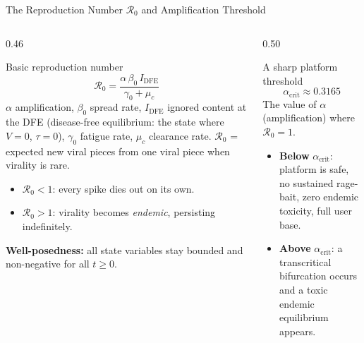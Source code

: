 \documentclass[aspectratio=169,11pt]{beamer}
\begin{document}
\begin{frame}{The Reproduction Number $\mathcal{R}_0$ and Amplification Threshold}
  \begin{columns}[T]
    \begin{column}{0.46\textwidth}
      \begin{block}{Basic reproduction number}
        \[
          \mathcal{R}_0
          = \frac{\alpha\,\beta_0\,I_{\mathrm{DFE}}}{\gamma_0 + \mu_c}
        \]
        \scriptsize
        $\alpha$ amplification, $\beta_0$ spread rate,
        $I_{\mathrm{DFE}}$ ignored content at the DFE
        (disease-free equilibrium: the state where $V{=}0$, $\tau{=}0$),
        $\gamma_0$ fatigue rate, $\mu_c$ clearance rate.
        \vspace{0.1em}
        \small $\mathcal{R}_0$ = expected new viral pieces from one viral piece
        when virality is rare.
      \end{block}

      \vspace{0.2em}
      \small
      \begin{itemize}
        \item $\mathcal{R}_0 < 1$: every spike dies out on its own.
        \item $\mathcal{R}_0 > 1$: virality becomes \emph{endemic},
              persisting indefinitely.
      \end{itemize}

      \vspace{0.15em}
      \small\textbf{Well-posedness:} all state variables stay bounded
      and non-negative for all $t \geq 0$.
    \end{column}
    \begin{column}{0.50\textwidth}
      \begin{alertblock}{A sharp platform threshold}
        \[
          \boxed{\;\alpha_{\mathrm{crit}} \approx 0.3165\;}
        \]
        \small The value of $\alpha$ (amplification) where $\mathcal{R}_0 = 1$.
      \end{alertblock}

      \vspace{0.25em}
      \small
      \begin{itemize}
        \item \textbf{Below} $\alpha_{\mathrm{crit}}$: platform is safe,
              no sustained rage-bait, zero endemic toxicity, full user base.
        \item \textbf{Above} $\alpha_{\mathrm{crit}}$: a transcritical
              bifurcation occurs and a toxic endemic equilibrium appears.
      \end{itemize}
    \end{column}
  \end{columns}
\end{frame}
\end{document}
